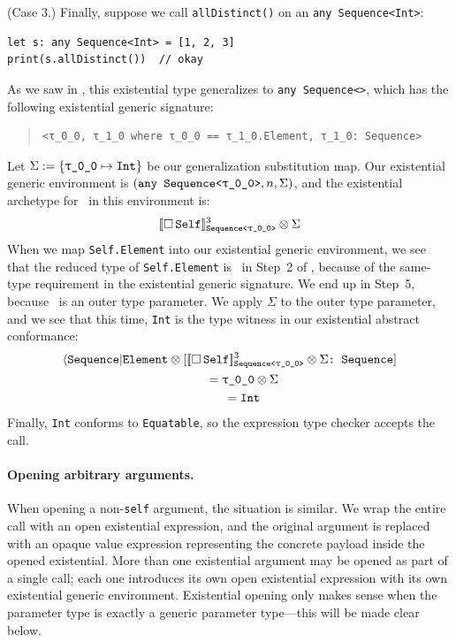 \documentclass[../generics]{subfiles}
\begin{document}
\begin{example}
\smallskip

(Case 3.) Finally, suppose we call \texttt{allDistinct()} on an \texttt{any Sequence<Int>}:
\begin{Verbatim}
let s: any Sequence<Int> = [1, 2, 3]
print(s.allDistinct())  // okay
\end{Verbatim}
As we saw in , this existential type generalizes to \texttt{any~Sequence<\rT>}, which has the following existential generic signature:
\begin{quote}
\begin{verbatim}
<τ_0_0, τ_1_0 where τ_0_0 == τ_1_0.Element, τ_1_0: Sequence>
\end{verbatim}
\end{quote}
Let $\Sigma := \SubstMap{\SubstType{\rT}{Int}}$ be our generalization substitution map. Our existential generic environment is $(\texttt{any Sequence<\rT>}, n, \Sigma)$, and the existential archetype for \tSelf\ in this environment is:
\[
\ESelf^3_\texttt{Sequence<\rT>} \otimes \Sigma
\]
 When we map \texttt{Self.Element} into our existential generic environment, we see that the reduced type of \texttt{Self.Element} is \rT\ in Step~2 of , because of the same-type requirement in the existential generic signature. We end up in Step~5, because \rT\ is an outer type parameter. We apply $\Sigma$ to the outer type parameter, and we see that this time, \texttt{Int} is the type witness in our existential abstract conformance:
\begin{gather*}
\AElement \otimes \ConfReq{$\ESelf^3_\texttt{Sequence<\rT>} \otimes \Sigma$}{Sequence} \\
\qquad {} = \rT \otimes \Sigma\\
\qquad {} = \texttt{Int}
\end{gather*}
Finally, \texttt{Int} conforms to \texttt{Equatable}, so the expression type checker accepts the call.
\end{example}

\paragraph{Opening arbitrary arguments.}
When opening a non-\texttt{self} argument, the situation is similar. We wrap the entire call with an open existential expression, and the original argument is replaced with an opaque value expression representing the concrete payload inside the opened existential. More than one existential argument may be opened as part of a single call; each one introduces its own open existential expression with its own existential generic environment. Existential opening only makes sense when the parameter type is exactly a generic parameter type---this will be made clear below.
\end{document}
